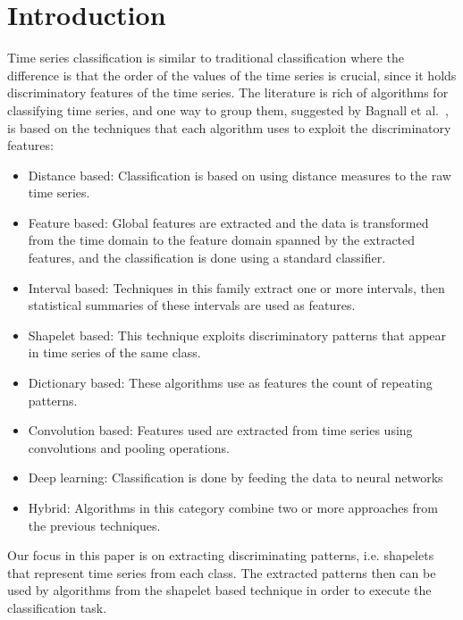 \documentclass[sigconf, nonacm]{acmart}
\begin{document}
\section{Introduction}
Time series classification is similar to traditional classification where the
difference is that the order of the values of the time series is crucial, since
it holds discriminatory features of the time series. The literature is rich of
algorithms for classifying time series, and one way to group them,
suggested by Bagnall et al.~\cite{bake_off}, is based on the techniques that
each algorithm uses to exploit the discriminatory features:
\begin{itemize}
	\item Distance based: Classification is based on using distance measures to
	      the raw time series.
	\item Feature based: Global features are extracted and the data is transformed
	      from the time domain to the feature domain spanned by the extracted
	      features, and the classification is done using a standard classifier.
	\item Interval based: Techniques in this family extract one or more intervals,
	      then statistical summaries of these intervals are used as features.
	\item Shapelet based: This technique exploits discriminatory patterns that
	      appear in time series of the same class.
	\item Dictionary based: These algorithms use as features the count of
	      repeating patterns.
	\item Convolution based: Features used are extracted from time series using
	      convolutions and pooling operations.
	\item Deep learning: Classification is done by feeding the data to neural
	      networks
	\item Hybrid: Algorithms in this category combine two or more approaches from
	      the previous techniques.
\end{itemize}
Our focus in this paper is on extracting discriminating patterns, i.e. shapelets
that represent time series from each class. The extracted patterns then can be
used by algorithms from the shapelet based technique in order to execute the
classification task.
\end{document}
